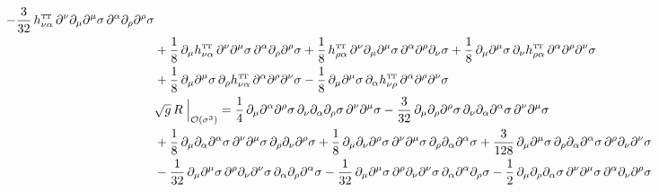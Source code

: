 \documentclass[11pt]{book}
\newcommand\TTspace{ -1pt }
\newcommand\TT{ \scriptscriptstyle{\mathrm{T\hspace{\TTspace}T}} }
\numberwithin{equation}{chapter}
\begin{document}
\begin{appendices}
\begin{align}
   - \frac{3}{32} \, h^{{\TT}}_{\nu\alpha } \, \partial^{\nu}\partial_{\mu}\partial^{\mu}\sigma \, \partial^{\alpha }\partial_{\rho}\partial^{\rho}\sigma \nonumber \\
  &+ \frac{1}{8}  \, \partial_{\mu}h^{{\TT}}_{\nu\alpha } \, \partial^{\nu}\partial^{\mu}\sigma \, \partial^{\alpha }\partial_{\rho}\partial^{\rho}\sigma
   + \frac{1}{8}  \, h^{{\TT}}_{\rho\alpha } \, \partial^{\nu}\partial_{\mu}\partial^{\mu}\sigma \, \partial^{\alpha }\partial^{\rho}\partial_{\nu}\sigma
   + \frac{1}{8}  \, \partial_{\mu}\partial^{\mu}\sigma \, \partial_{\nu}h^{{\TT}}_{\rho\alpha } \, \partial^{\alpha }\partial^{\rho}\partial^{\nu}\sigma \nonumber \\
  &+ \frac{1}{8}  \, \partial_{\mu}\partial^{\mu}\sigma \, \partial_{\rho}h^{{\TT}}_{\nu\alpha } \, \partial^{\alpha }\partial^{\rho}\partial^{\nu}\sigma
   - \frac{1}{8}  \, \partial_{\mu}\partial^{\mu}\sigma \, \partial_{\alpha }h^{{\TT}}_{\nu\rho} \, \partial^{\alpha }\partial^{\rho}\partial^{\nu}\sigma
  \\
  &\sqrt{g} \, R \; \Big|_{\mathcal O(\sigma^3)} =
     \frac{1}{4}   \, \partial_{\mu}\partial^{\alpha }\partial^{\rho}\sigma \, \partial_{\nu}\partial_{\alpha }\partial_{\rho}\sigma \, \partial^{\nu}\partial^{\mu}\sigma
   - \frac{3}{32}  \, \partial_{\mu}\partial_{\rho}\partial^{\rho}\sigma \, \partial_{\nu}\partial_{\alpha }\partial^{\alpha }\sigma \, \partial^{\nu}\partial^{\mu}\sigma \nonumber \\
  &+ \frac{1}{8}   \, \partial_{\mu}\partial_{\alpha }\partial^{\alpha }\sigma \, \partial^{\nu}\partial^{\mu}\sigma \, \partial_{\rho}\partial_{\nu}\partial^{\rho}\sigma
   + \frac{1}{8}   \, \partial_{\mu}\partial_{\nu}\partial^{\rho}\sigma \, \partial^{\nu}\partial^{\mu}\sigma \, \partial_{\rho}\partial_{\alpha }\partial^{\alpha }\sigma
   + \frac{3}{128} \, \partial_{\mu}\partial^{\mu}\sigma \, \partial_{\rho}\partial_{\alpha }\partial^{\alpha }\sigma \, \partial^{\rho}\partial_{\nu}\partial^{\nu}\sigma \nonumber \\
  &- \frac{1}{32}  \, \partial_{\mu}\partial^{\mu}\sigma \, \partial^{\rho}\partial_{\nu}\partial^{\nu}\sigma \, \partial_{\alpha }\partial_{\rho}\partial^{\alpha }\sigma
   - \frac{1}{32}  \, \partial_{\mu}\partial^{\mu}\sigma \, \partial^{\rho}\partial_{\nu}\partial^{\nu}\sigma \, \partial_{\alpha }\partial^{\alpha }\partial_{\rho}\sigma
   - \frac{1}{2}   \, \partial_{\mu}\partial_{\rho}\partial_{\alpha }\sigma \, \partial^{\nu}\partial^{\mu}\sigma \, \partial^{\alpha }\partial_{\nu}\partial^{\rho}\sigma \nonumber \\

\end{align}
\end{appendices}
\end{document}
